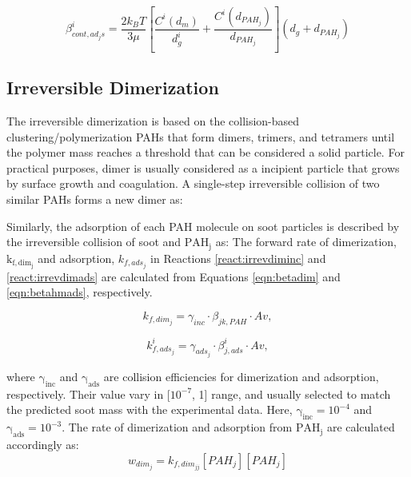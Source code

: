 \begin{equation}
	\beta^i_{cont, ad_js}=
		\frac{2 k_B T}{3 \mu}
		\left[
			\frac{C^i\left(d_m\right)}{d^i_g}+
			\frac{C^i\left(d_{PAH_j}\right)}{d_{PAH_j}}
		\right]
		\left(d_g+d_{PAH_j}\right)
	\label{eqn:betacontads}
\end{equation}

\subsection{Irreversible Dimerization}

The irreversible dimerization is based on the collision-based clustering/polymerization PAHs that form dimers, trimers, and tetramers until the polymer mass reaches a threshold that can be considered a solid particle. For practical purposes, dimer is usually considered as a incipient particle that grows by surface growth and coagulation. A single-step irreversible collision of two similar PAHs forms a new dimer as:

Similarly, the adsorption of each PAH molecule on soot particles is described by the irreversible collision of soot and $\mathrm{PAH_j}$ as:
The forward rate of dimerization, $\mathrm{k_{f,dim_j}}$ and adsorption, $k_{f,ads_j}$ in Reactions \eqref{react:irrevdiminc} and \eqref{react:irrevdimads} are calculated from Equations \eqref{eqn:betadim} and \eqref{eqn:betahmads}, respectively.

\begin{equation}
	k_{f,dim_j}=
	\gamma_{inc}\cdot\beta_{jk,PAH}\cdot Av
	\label{eqn:kfdim},
\end{equation}

\begin{equation}
	k^i_{f,ads_j}=
	\gamma_{ads_j}\cdot\beta^i_{j,ads}\cdot Av
	\label{eqn:kfads},
\end{equation}

where $\mathrm{\gamma_{inc}}$ and $\mathrm{\gamma_{ads}}$ are collision efficiencies for dimerization and adsorption, respectively. Their value vary in [$\mathrm{10^{-7}}$, 1] range, and usually selected to match the predicted soot mass with the experimental data. Here, $\mathrm{\gamma_{inc}}=10^{-4}$ and $\mathrm{\gamma_{ads}=10^{-3}}$. The rate of dimerization and adsorption from $\mathrm{PAH_j}$ are calculated accordingly as:
\begin{equation}
	w_{dim_j} = k_{f,dim_{jj}} [PAH_j] [PAH_j]
\end{equation}

